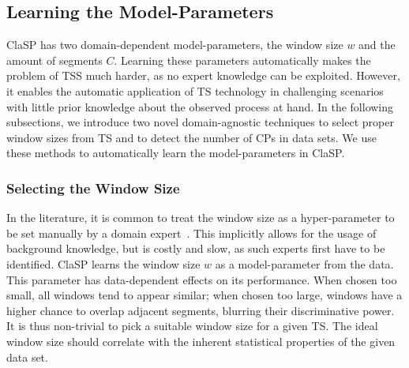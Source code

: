 \documentclass[pdflatex,sn-basic]{sn-jnl}
\begin{document}
\subsection{Learning the Model-Parameters} \label{sec:model-param}

ClaSP has two domain-dependent model-parameters, the window size $w$ and the amount of segments $C$. Learning these parameters automatically makes the problem of TSS much harder, as no expert knowledge can be exploited. However, it enables the automatic application of TS technology in challenging scenarios with little prior knowledge about the observed process at hand. In the following subsections, we introduce two novel domain-agnostic techniques to select proper window sizes from TS and to detect the number of CPs in data sets. We use these methods to automatically learn the model-parameters in ClaSP. 

\subsubsection{Selecting the Window Size} \label{sec:window-size-selec}

In the literature, it is common to treat the window size as a hyper-parameter to be set manually by a domain expert~\citep{gharghabi2017matrix}. This implicitly allows for the usage of background knowledge, but is costly and slow, as such experts first have to be identified. ClaSP learns the window size $w$ as a model-parameter from the data. This parameter has data-dependent effects on its performance. When chosen too small, all windows tend to appear similar; when chosen too large, windows have a higher chance to overlap adjacent segments, blurring their discriminative power. It is thus non-trivial to pick a suitable window size for a given TS. The ideal window size should correlate with the inherent statistical properties of the given data set.
\end{document}
